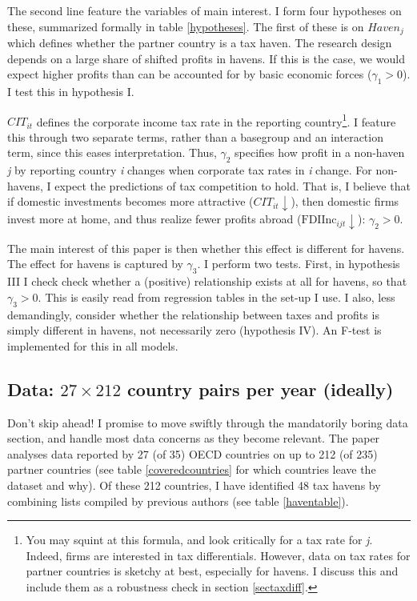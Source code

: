 \documentclass[twoside,a4paper,11pt]{article}
\begin{document}
The second line feature the variables of main interest. I form four hypotheses on these, summarized formally in table \ref{hypotheses}. The first of these is on $ Haven_j $ which defines whether the partner country is a tax haven. The research design depends on a large share of shifted profits in havens. If this is the case, we would expect higher profits than can be accounted for by basic economic forces ($ \gamma_1 >0 $). I test this in hypothesis I.

$ CIT_{it} $ defines the corporate income tax rate in the reporting country\footnote{You may squint at this formula, and look critically for a tax rate for \textit{j}. Indeed, firms are interested in tax differentials. However, data on tax rates for partner countries is sketchy at best, especially for havens. I discuss this and include them as a robustness check in section \ref{sectaxdiff}.}. I feature this through two separate terms, rather than a basegroup and an interaction term, since this eases interpretation. Thus, $ \gamma_2 $ specifies how profit in a non-haven \textit{j} by  reporting country \textit{i} changes when corporate tax rates in \textit{i} change. For non-havens, I expect the predictions of tax competition to hold. That is, I believe that if domestic investments becomes more attractive ($ CIT_{it}\downarrow $), then domestic firms invest more at home, and thus realize fewer profits abroad ($ \text{FDIInc}_{ijt} \downarrow $): $ \gamma_2 >0 $. 

The main interest of this paper is then whether this effect is different for havens. The effect for havens is captured by $ \gamma_3 $. I perform two tests. First, in hypothesis III I check  check whether a (positive) relationship exists at all for havens, so that $ \gamma_3 >0 $. This is easily read from regression tables in the set-up I use. I also, less demandingly, consider whether the relationship between taxes and profits is simply different in havens, not necessarily zero (hypothesis IV).  An F-test is implemented for this in all models. 



\subsection{Data:  $27 \times 212 $ country pairs per year (ideally)}
Don't skip ahead! I promise to move swiftly through the mandatorily boring data section, and handle most data concerns as they become relevant. The paper analyses data reported by 27 (of 35) OECD countries on up to 212 (of 235) partner countries (see table \ref{coveredcountries} for which countries leave the dataset and why). Of these 212 countries, I have identified 48 tax havens by combining lists compiled by previous authors (see table \ref{haventable}). 
\end{document}
